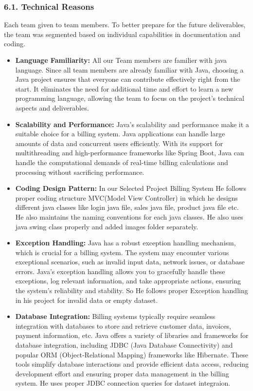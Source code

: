 \documentclass[12pt,letterpaper]{report}
\begin{document}
\subsubsection*{6.1. Technical Reasons}
Each team given to team members. To better prepare for the future deliverables, the team was segmented based on individual capabilities in documentation and coding.
\begin{itemize}
    \item \textbf{Language Familiarity:} All our Team members are familier with java language. Since all team members are already familiar with Java, choosing a Java project ensures that everyone can contribute effectively right from the start. It eliminates the need for additional time and effort to learn a new programming language, allowing the team to focus on the project's technical aspects and deliverables.
    \item \textbf{Scalability and Performance:} Java's scalability and performance make it a suitable choice for a billing system. Java applications can handle large amounts of data and concurrent users efficiently. With its support for multithreading and high-performance frameworks like Spring Boot, Java can handle the computational demands of real-time billing calculations and processing without sacrificing performance.
    \item \textbf{Coding Design Pattern:} In our Selected Project Billing System He follows proper coding structure MVC(Model View Controller) in which he designs different java classes like login java file, sales java file, product java file etc. He also maintains the naming conventions for each java classes. He also uses java swing class properly and added images folder separately. 
    \item \textbf{Exception Handling:} Java has a robust exception handling mechanism, which is crucial for a billing system. The system may encounter various exceptional scenarios, such as invalid input data, network issues, or database errors. Java's exception handling allows you to gracefully handle these exceptions, log relevant information, and take appropriate actions, ensuring the system's reliability and stability. So He follows proper Exception handling in his project for invalid data or empty dataset.
    \item \textbf{Database Integration:} Billing systems typically require seamless integration with databases to store and retrieve customer data, invoices, payment information, etc. Java offers a variety of libraries and frameworks for database integration, including JDBC (Java Database Connectivity) and popular ORM (Object-Relational Mapping) frameworks like Hibernate. These tools simplify database interactions and provide efficient data access, reducing development effort and ensuring proper data management in the billing system. He uses proper JDBC connection queries for dataset integraion.  
\end{itemize}
\end{document}
